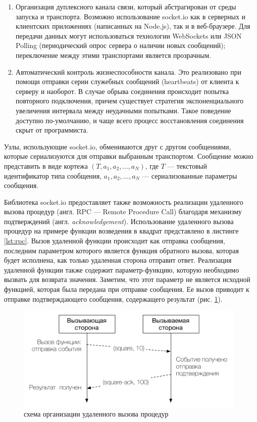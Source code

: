 \documentclass[a4paper,14pt,href]{article}
\begin{document}
\begin{enumerate}
  \item Организация дуплексного канала связи, который абстрагирован от среды запуска и транспорта. Возможно использование
  socket.io как в серверных и клиентских приложениях (написанных на Node.js), так и в веб-браузере. Для передачи данных
  могут использоваться технологии WebSockets или JSON Polling (периодический опрос сервера о наличии новых сообщений);
  переключение между этими транспортами является прозрачным.

  \item Автоматический контроль жизнеспособности канала. Это реализовано при помощи отправки серии служебных сообщений
  (heartbeats) от клиента к серверу и наоборот. В случае обрыва соединения происходит попытка повторного подключения,
  причем существует стратегия экспоненциального увеличения интервала между неудачными попытками. Такое поведение доступно
  по-умолчанию, и чаще всего процесс восстановления соединения скрыт от программиста.
\end{enumerate}

Узлы, использующие socket.io, обмениваются друг с другом сообщениями, которые сериализуются для отправки выбранным
транспортом. Сообщение можно представить в виде кортежа $(T, a_1, a_2, ..., a_N)$, где $T$ --- текстовый идентификатор
типа сообщения, $a_1, a_2, ..., a_N $ --- сериализованные параметры сообщения.

Библиотека socket.io предоставляет также возможность реализации удаленного вызова процедур (англ. RPC --- Remote
Procedure Call) благодаря механизму подтверждений (англ. \textit{acknowledgement}). Использование удаленного вызова
процедур на примере функции возведения в квадрат представлено в листинге \ref{lst:rpc}. Вызов удаленной функции происходит
как отправка сообщения, последним параметром которого является функция обратного вызова, которая будет исполнена, как только
удаленная сторона отправит ответ. Реализация удаленной функции также содержит параметр-функцию, которую необходимо вызвать
для возврата значения. Заметим, что этот параметр не является исходной функцией, которая была передана при отправке
сообщения. Ее вызов приводит к отправке подтверждающего сообщения, содержащего результат (рис. \ref{fig:RpcSchema}).

\begin{figure}[htbp]
\begin{center}
  \includegraphics[scale=0.8]{rpc-schema.pdf}
    \caption{схема организации удаленного вызова процедур}
    \label{fig:RpcSchema}
\end{center}
\end{figure}
\end{document}
